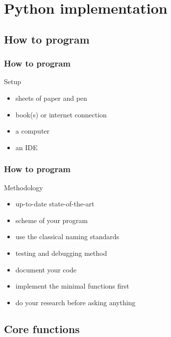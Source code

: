 \documentclass[compress, english, aspectratio=169]{beamer}
\begin{document}
\section{Python implementation}
\subsection{How to program}
\begin{frame}
\frametitle{How to program}
\begin{block}{Setup}
\begin{itemize}
\item sheets of paper and pen
\item book(s) or internet connection
\item a computer
\item an IDE
\end{itemize}
\end{block}
\end{frame}

\begin{frame}
\frametitle{How to program}
\begin{block}{Methodology}
\begin{itemize}
\item up-to-date state-of-the-art
\item scheme of your program
\item use the classical naming standards
\item testing and debugging method
\item document your code
\item implement the minimal functions first
\item do your research before asking anything
\end{itemize}
\end{block}
\end{frame}



\subsection{Core functions}
\end{document}
